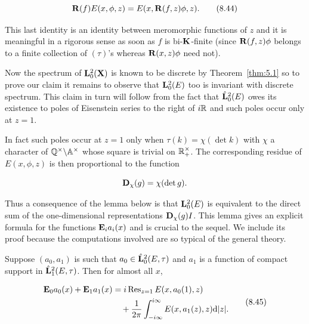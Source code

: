 \begin{equation}\label{eq:8.44}
\mathbf{R}(f)E(x,\phi,z) = E(x,\mathbf{R}(f,z)\phi,z).\tag{8.44}
\end{equation}

This last identity is an identity between meromorphic functions of $z$ and it is meaningful in a rigorous sense as soon as $f$ is bi-$\mathbf{K}$-finite (since $\mathbf{R}(f,z)\phi$ belongs to a finite collection of $(\tau)$'s whereas $\mathbf{R}(x,z)\phi$ need not).

Now the spectrum of $\mathbf{L}_{0}^{2}(\mathbf{X})$ is known to be discrete by Theorem~\ref{thm:5.1} so to prove our claim it remains to observe that $\mathbf{L}_{0}^{2}(E)$ too is invariant with discrete spectrum. This claim in turn will follow from the fact that $\hat{\mathbf{L}}_{0}^{2}(E)$ owes its existence to poles of Eisenstein series to the right of $i\mathbb{R}$ and such poles occur only at $z = 1$.

In fact such poles occur at $z = 1$ only when $\tau(k) = \chi(\det k)$ with $\chi$ a character of $\mathbb{Q}^{\times}\backslash\mathbb{A}^{\times}$ whose square is trivial on $\mathbb{R}_{+}^{\times}$. The corresponding residue of $E(x,\phi,z)$ is then proportional to the function

\[
\mathbf{D}_{\chi}(g) = \chi(\det g).
\]

Thus a consequence of the lemma below is that $\mathbf{L}_{0}^{2}(E)$ is equivalent to the direct sum of the one-dimensional representations $\mathbf{D}_{\chi}(g)I$. This lemma gives an explicit formula for the functions $\mathbf{E}_{i}a_{i}(x)$ and is crucial to the sequel. We include its proof because the computations involved are so typical of the general theory.

\begin{lemma}\label{lem:8.6}

Suppose $(a_{0},a_{1})$ is such that $a_{0} \in \hat{\mathbf{L}}_{0}^{2}(E,\tau)$ and $a_{1}$ is a function of compact support in $\hat{\mathbf{L}}_{1}^{2}(E,\tau)$. Then for almost all $x$,

\begin{equation}\label{eq:8.45}
\begin{aligned}
\mathbf{E}_{0}a_{0}(x) + \mathbf{E}_{1}a_{1}(x) &= i\operatorname{Res}_{z=1} E(x,a_{0}(1),z)\\
&\quad + \frac{1}{2\pi}\int_{-i\infty}^{i\infty} E(x,a_{1}(z),z) \mathrm{d}|z|.
\end{aligned}\tag{8.45}
\end{equation}

\end{lemma}

